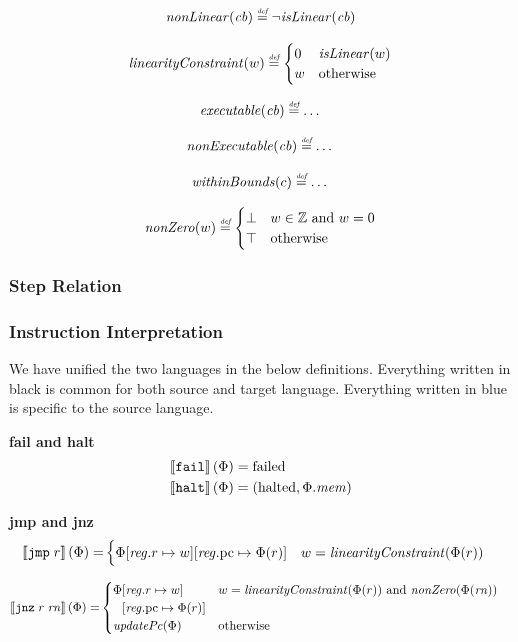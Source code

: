 \documentclass[a3paper]{article}
\newcommand{\defeq}{\stackrel{\textit{\tiny{def}}}{=}}
\newcommand{\sem}[1]{\left\llbracket #1 \right\rrbracket}
\newcommand{\tand}{\text{ and }}
\newcommand{\totherwise}{\text{otherwise }}
\newcommand{\sourcecolor}{\color{blue}}
\newcommand{\src}[1]{{\sourcecolor #1}}
\newcommand{\targetcolor}[1]{\color{black}}
\newcommand{\trg}[1]{{\targetcolor{} #1}}
\newcommand{\zinstr}[1]{\texttt{#1}}
\newcommand{\oneinstr}[2]{
  \ifthenelse{\equal{#2}{}}
  {\zinstr{#1}}
  {\zinstr{#1} \; #2}
}
\newcommand{\twoinstr}[3]{
  \ifthenelse{\equal{#2#3}{}}
  {\zinstr{#1}}
  {\zinstr{#1} \; #2 \; #3}
}
\newcommand{\tfail}{\zinstr{\trg{fail}}}
\newcommand{\thalt}{\zinstr{\trg{halt}}}
\newcommand{\tjmp}[1]{\oneinstr{\trg{jmp}}{#1}}
\newcommand{\tjnz}[2]{\twoinstr{\trg{jnz}}{#1}{#2}}
\newcommand{\ints}{\mathbb{Z}}
\newcommand{\update}[2]{[#1 \mapsto #2]}
\newcommand{\updReg}[2]{\update{\reg.#1}{#2}}
\newcommand{\failed}{\mathrm{failed}}
\newcommand{\halted}{\mathrm{halted}}
\newcommand{\var}[1]{\mathit{#1}}
\newcommand{\rn}{\var{rn}}
\newcommand{\reg}{\var{reg}}
\newcommand{\mem}{\var{mem}}
\newcommand{\cb}{\var{cb}}
\newcommand{\pcreg}{\mathrm{pc}}
\newcommand{\plainfun}[2]{
  \ifthenelse{\equal{#2}{}}
  {\mathit{#1}}
  {\mathit{#1}(#2)}
}
\newcommand{\exec}[1]{\plainfun{executable}{#1}}
\newcommand{\isLinear}[1]{\plainfun{isLinear}{#1}}
\newcommand{\linCons}[1]{\plainfun{linearityConstraint}{#1}}
\newcommand{\nonExec}[1]{\plainfun{nonExecutable}{#1}}
\newcommand{\nonLinear}[1]{\plainfun{nonLinear}{#1}}
\newcommand{\nonZero}[1]{\plainfun{nonZero}{#1}}
\newcommand{\updPcAddr}[1]{\plainfun{updatePc}{#1}}
\newcommand{\withinBounds}[1]{\plainfun{withinBounds}{#1}}
\begin{document}
\[
  \nonLinear{\cb} \defeq \neg \isLinear{\cb}
\]

\[
  \linCons{w} \defeq
  \begin{cases}
    0 & \isLinear{w} \\
    w & \totherwise
  \end{cases}
\]

\[
  \exec{\cb} \defeq \dots
\]

\[
  \nonExec{\cb} \defeq \dots
\]

\[
  \withinBounds{c} \defeq \dots
\]

\[
  \nonZero{w} \defeq
  \begin{cases}
    \bot & w \in \ints \tand w = 0 \\
    \top & \totherwise
  \end{cases}
\]

\subsubsection{Step Relation}

\subsubsection{Instruction Interpretation}
We have unified the two languages in the below definitions. Everything written in black is common for both source and target language. Everything written in \src{blue} is specific to the source language.

\noindent\textbf{fail and halt}\\
\begin{align*}
  \sem{\tfail}(\Phi) = & \; \failed \\
  \sem{\thalt}(\Phi) = & \; (\halted, \Phi.\mem)
\end{align*}

\noindent\textbf{jmp and jnz}\\
\begin{align*}
  \sem{\tjmp{r}}(\Phi) = &  
                     \begin{cases}
                       \Phi\updReg{r}{w}\updReg{\pcreg}{\Phi(r)} & w = \linCons{\Phi(r)}
                     \end{cases}
\end{align*}

\begin{align*}
  \sem{\tjnz{r}{\rn}}(\Phi) = &       
                             \begin{cases}
                               \arraycolsep=0pt
                               \begin{array}[t]{rl}
                                 \Phi&\updReg{r}{w}\\
                                     &\updReg{\pcreg}{\Phi(r)}
                               \end{array}
                                               & w = \linCons{\Phi(r)} \tand \nonZero{\Phi(\rn)}\\
                               \updPcAddr{\Phi} & \totherwise
                             \end{cases}
\end{align*}
\end{document}
